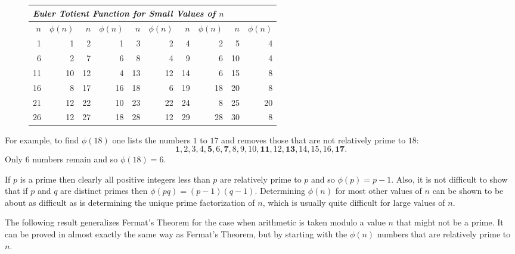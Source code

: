 \begin{figure*}[htb]\begin{center}
\begin{tabular}{|r|r||r|r||r|r||r|r||r|r|} \hline
  \multicolumn{10}{|l|}{\textit{Euler Totient Function for Small Values of $n$}} \\ \hline\hline
  \textit{$n$} & \textit{$\phi(n)$} & \textit{$n$} & \textit{$\phi(n)$}
  & \textit{$n$} & \textit{$\phi(n)$} & \textit{$n$} & \textit{$\phi(n)$}
  & \textit{$n$} & \textit{$\phi(n)$} \\ \hline
  1 & 1 & 2 & 1 & 3 & 2 & 4 & 2 & 5 & 4 \\
  6 & 2 & 7 & 6 & 8 & 4 & 9 & 6 & 10 & 4 \\
  11 & 10 & 12 & 4 & 13 & 12 & 14 & 6 & 15 & 8 \\
  16 & 8 & 17 & 16 & 18 & 6 & 19 & 18 & 20 & 8 \\
  21 & 12 & 22 & 10 & 23 & 22 & 24 & 8 & 25 & 20 \\
  26 & 12 & 27 & 18 & 28 & 12 & 29 & 28 & 30 & 8 \\\hline
\end{tabular}
\end{center}\end{figure*}

For example, to find $\phi(18)$ one lists the numbers $1$ to $17$ and removes
those that are not relatively prime to $18$:
\begin{displaymath}
  \mathbf{1}, \mathit{2}, \mathit{3}, \mathit{4}, \mathbf{5}, \mathit{6},
  \mathbf{7}, \mathit{8}, \mathit{9}, \mathit{10}, \mathbf{11}, \mathit{12},
  \mathbf{13}, \mathit{14}, \mathit{15}, \mathit{16}, \mathbf{17}.
\end{displaymath}
Only $6$ numbers remain and so $\phi(18)=6$.

If $p$ is a prime then clearly all positive integers less than $p$ are relatively
prime to $p$ and so $\phi(p)=p-1$. Also, it is not difficult to show that
if $p$ and $q$ are distinct primes then $\phi(pq)=(p-1)(q-1)$.
Determining $\phi(n)$ for most other values of $n$ can be shown to be about as difficult
as is determining the unique prime factorization of $n$, which is usually quite difficult
for large values of $n$.

The following result generalizes Fermat's Theorem for the case when arithmetic
is taken modulo a value $n$ that might not be a prime. It can be proved in almost
exactly the same way as Fermat's Theorem, but by starting with the $\phi(n)$ numbers
that are relatively prime to $n$.

